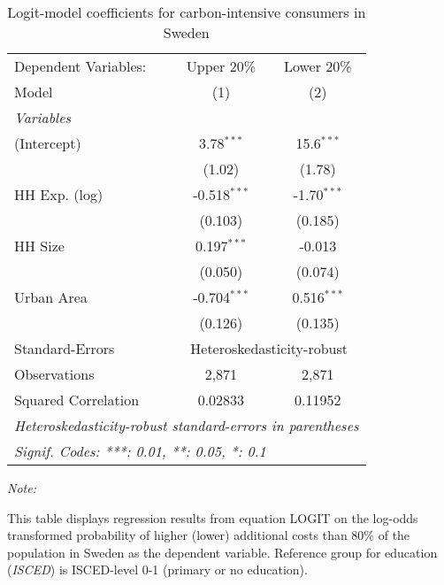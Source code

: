 
\begin{table}[htbp!]
   \centering
   \small
   \begin{adjustbox}{width = 1\textwidth, max height = 0.95\textheight, center}
      \begin{threeparttable}[b]
         \caption{\label{tab:Logit_1_SWE} Logit-model coefficients for carbon-intensive consumers in Sweden}
         \begin{tabular}{lcc}
            \tabularnewline \midrule \midrule
            Dependent Variables: & Upper 20\%     & Lower 20\%\\   
            Model                & (1)            & (2)\\  
            \midrule
            \emph{Variables}\\
            (Intercept)          & 3.78$^{***}$   & 15.6$^{***}$\\   
                                 & (1.02)         & (1.78)\\   
            HH Exp. (log)        & -0.518$^{***}$ & -1.70$^{***}$\\   
                                 & (0.103)        & (0.185)\\   
            HH Size              & 0.197$^{***}$  & -0.013\\   
                                 & (0.050)        & (0.074)\\   
            Urban Area           & -0.704$^{***}$ & 0.516$^{***}$\\   
                                 & (0.126)        & (0.135)\\   
            \midrule 
            Standard-Errors & \multicolumn{2}{c}{Heteroskedasticity-robust} \\ 
            Observations         & 2,871          & 2,871\\  
            Squared Correlation  & 0.02833        & 0.11952\\  
            \midrule \midrule
            \multicolumn{3}{l}{\emph{Heteroskedasticity-robust standard-errors in parentheses}}\\
            \multicolumn{3}{l}{\emph{Signif. Codes: ***: 0.01, **: 0.05, *: 0.1}}\\
         \end{tabular}
         
         \begin{tablenotes}\item \medskip \textit{Note:}
            \item This table displays regression results from equation LOGIT on the log-odds transformed probability of higher (lower) additional costs than 80\% of the population in Sweden as the dependent variable. Reference group for education (\textit{ISCED}) is ISCED-level 0-1 (primary or no education).
         \end{tablenotes}
      \end{threeparttable}
   \end{adjustbox}
\end{table}


